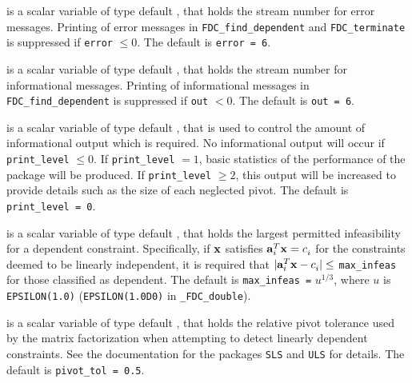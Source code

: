 \documentclass{galahad}
\newcommand{\packagename}{FDC}
\newcommand{\fullpackagename}{\libraryname\_\-\packagename}
\begin{document}
\begin{description}

 is a scalar variable of type default \integer, that holds the
stream number for error messages. Printing of error messages in
{\tt \packagename\_find\_dependent} and {\tt \packagename\_terminate}
is suppressed if {\tt error} $\leq 0$.
The default is {\tt error = 6}.

 is a scalar variable of type default \integer, that holds the
stream number for informational messages. Printing of informational messages in
{\tt \packagename\_find\_dependent} is suppressed if {\tt out} $< 0$.
The default is {\tt out = 6}.

 is a scalar variable of type default \integer, that is used
to control the amount of informational output which is required. No
informational output will occur if {\tt print\_level} $\leq 0$. If
{\tt print\_level} $= 1$, basic statistics of the performance of the
package will be produced. If {\tt print\_level} $\geq 2$, this output will be
increased to provide details such as the size of each neglected pivot.
The default is {\tt print\_level = 0}.



 is a scalar variable of type default \realdp, that holds the
largest permitted infeasibility for a dependent constraint. Specifically, if
${\mathbf{x}}$ satisfies ${\mathbf{a}}_i^T {\mathbf{x}} = c_i^{}$ for the constraints deemed to be
linearly independent, it is required that $|{\mathbf{a}}_i^T {\mathbf{x}} - c_i^{}| \leq$
{\tt max\_infeas} for those classified as dependent.
The default is {\tt max\_infeas =} $u^{1/3}$,
where $u$ is {\tt EPSILON(1.0)} ({\tt EPSILON(1.0D0)} in
{\tt \fullpackagename\_double}).

 is a scalar variable of type default
\realdp, that holds the
relative pivot  tolerance used by the matrix factorization when
attempting to detect linearly dependent constraints.
See the documentation for the packages {\tt SLS} and {\tt ULS} for details.
The default is {\tt pivot\_tol = 0.5}.


\end{description}
\end{document}
